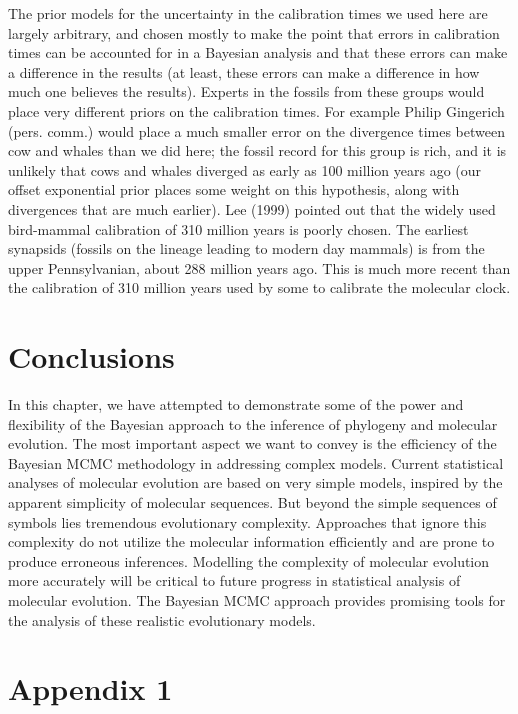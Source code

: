 \documentclass{svmult}
\begin{document}
The prior models for the uncertainty in the calibration times we used here are largely arbitrary,
and chosen mostly to make the point that errors in calibration times can be accounted for in a
Bayesian analysis and that these errors can make a difference in the results (at least, these
errors can make a difference in how much one believes the results). Experts in the fossils from
these groups would place very different priors on the calibration times. For example Philip
Gingerich (pers. comm.) would place a much smaller error on the divergence times between cow and
whales than we did here; the fossil record for this group is rich, and it is unlikely that cows and
whales diverged as early as 100 million years ago (our offset exponential prior places some weight
on this hypothesis, along with divergences that are much earlier).  Lee (1999) pointed out that the
widely used bird-mammal calibration of 310 million years is poorly chosen. The earliest synapsids
(fossils on the lineage leading to modern day mammals) is from the upper Pennsylvanian, about 288
million years ago. This is much more recent than the calibration of 310 million years used by some
to calibrate the molecular clock. 

\section{Conclusions}
\label{sec:4}

In this chapter, we have attempted to demonstrate some of the power and ﬂexibility of the Bayesian
approach to the inference of phylogeny and molecular evolution. The most important aspect we want
to convey is the efficiency of the Bayesian MCMC methodology in addressing complex models.  Current
statistical analyses of molecular evolution are based on very simple models, inspired by the
apparent simplicity of molecular sequences. But beyond the simple sequences of symbols lies
tremendous evolutionary complexity. Approaches that ignore this complexity do not utilize the
molecular information efficiently and are prone to produce erroneous inferences. Modelling the
complexity of molecular evolution more accurately will be critical to future progress in
statistical analysis of molecular evolution. The Bayesian MCMC approach provides promising tools
for the analysis of these realistic evolutionary models.


\newpage


\section*{Appendix 1}
\end{document}
